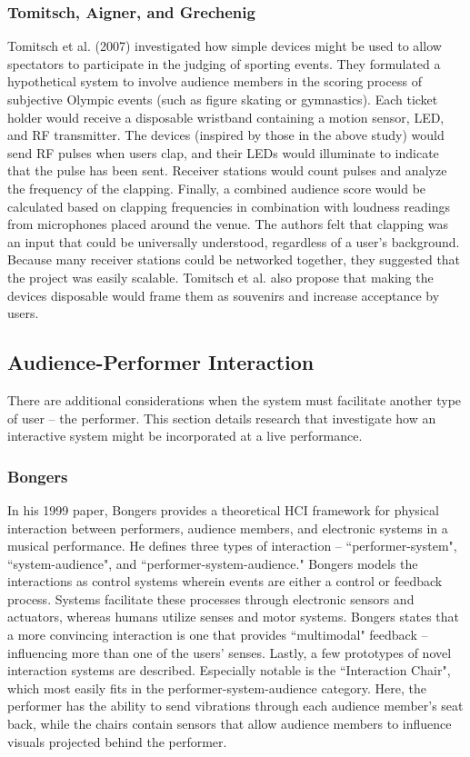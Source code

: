 \subsubsection{Tomitsch, Aigner, and Grechenig}

Tomitsch et al. (2007) investigated how simple devices might be used to allow spectators to participate in the judging of sporting events. They formulated a hypothetical system to involve audience members in the scoring process of subjective Olympic events (such as figure skating or gymnastics). Each ticket holder would receive a disposable wristband containing a motion sensor, LED, and RF transmitter. The devices (inspired by those in the above study) would send RF pulses when users clap, and their LEDs would illuminate to indicate that the pulse has been sent. Receiver stations would count pulses and analyze the frequency of the clapping. Finally, a combined audience score would be calculated based on clapping frequencies in combination with loudness readings from microphones placed around the venue. The authors felt that clapping was an input that could be universally understood, regardless of a user's background. Because many receiver stations could be networked together, they suggested that the project was easily scalable. Tomitsch et al. also propose that making the devices disposable would frame them as souvenirs and increase acceptance by users.

\subsection{Audience-Performer Interaction}

There are additional considerations when the system must facilitate another type of user -- the performer. This section details research that investigate how an interactive system might be incorporated at a live performance.

\subsubsection{Bongers}

In his 1999 paper, Bongers provides a theoretical HCI framework for physical interaction between performers, audience members, and electronic systems in a musical performance. He defines three types of interaction -- ``performer-system", ``system-audience", and ``performer-system-audience." Bongers models the interactions as control systems wherein events are either a control or feedback process. Systems facilitate these processes through electronic sensors and actuators, whereas humans utilize senses and motor systems. Bongers states that a more convincing interaction is one that provides ``multimodal" feedback -- influencing more than one of the users' senses. Lastly, a few prototypes of novel interaction systems are described. Especially notable is the ``Interaction Chair", which most easily fits in the performer-system-audience category. Here, the performer has the ability to send vibrations through each audience member's seat back, while the chairs contain sensors that allow audience members to influence visuals projected behind the performer.

